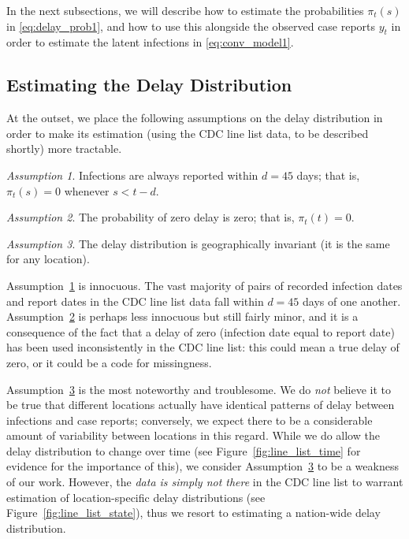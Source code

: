 \documentclass[sts]{imsart}
\theoremstyle{plain}
\theoremstyle{definition}
\theoremstyle{remark}
\newtheorem{assumption}{Assumption}
\begin{document}
In the next subsections, we will describe how to estimate the probabilities
$\pi_t(s)$ in \eqref{eq:delay_prob1}, and how to use this alongside the observed
case reports $y_t$ in order to estimate the latent infections in
\eqref{eq:conv_model1}. 

\subsection{Estimating the Delay Distribution} 
\label{sec:delay_distribution}

At the outset, we place the following assumptions on the delay distribution in 
order to make its estimation (using the CDC line list data, to be described
shortly) more tractable.   

\begin{assumption}
\label{asm:delay_support} 
Infections are always reported within $d=45$ days; that is, $\pi_t(s) = 0$
whenever $s < t-d$. 
\end{assumption}

\begin{assumption}
\label{asm:zero_at_zero}
The probability of zero delay is zero; that is, $\pi_t(t) = 0$.
\end{assumption}

\begin{assumption}
\label{asm:geo_invar}
The delay distribution is geographically invariant (it is the same for any
location). 
\end{assumption}

Assumption~\ref{asm:delay_support} is innocuous. The vast majority of pairs of
recorded infection dates and report dates in the CDC line list data fall within
$d=45$ days of one another. Assumption~\ref{asm:zero_at_zero} is perhaps less
innocuous but still fairly minor, and it is a consequence of the fact that a
delay of zero (infection date equal to report date) has been used inconsistently
in the CDC line list: this could mean a true delay of zero, or it could be a
code for missingness.

Assumption~\ref{asm:geo_invar} is the most noteworthy and troublesome. We do
\emph{not} believe it to be true that different locations actually have
identical patterns of delay between infections and case reports; conversely, we 
expect there to be a considerable amount of variability between locations in
this regard. While we do allow the delay distribution to change over time (see
Figure~\ref{fig:line_list_time} for evidence for the importance of this), we 
consider Assumption~\ref{asm:geo_invar} to be a weakness of our work. However,
the \emph{data is simply not there} in the CDC line list to warrant estimation
of location-specific delay distributions (see Figure~\ref{fig:line_list_state}), 
thus we resort to estimating a nation-wide delay distribution.
\end{document}

